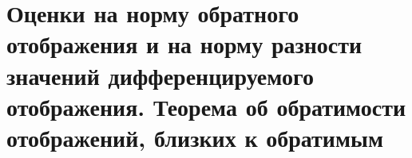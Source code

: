 \section{Оценки на норму обратного отображения и на норму разности значений дифференцируемого отображения. Теорема об обратимости отображений, близких к обратимым}
